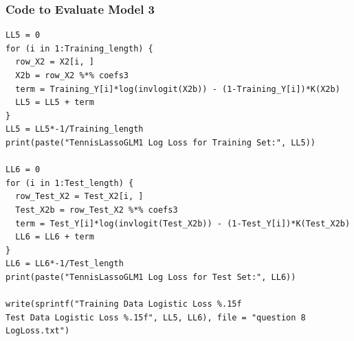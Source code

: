 \documentclass[11pt]{article} %
\begin{document}
\subsubsection*{Code to Evaluate Model 3}
\begin{lstlisting}
LL5 = 0
for (i in 1:Training_length) {
  row_X2 = X2[i, ]
  X2b = row_X2 %*% coefs3
  term = Training_Y[i]*log(invlogit(X2b)) - (1-Training_Y[i])*K(X2b)
  LL5 = LL5 + term
}
LL5 = LL5*-1/Training_length
print(paste("TennisLassoGLM1 Log Loss for Training Set:", LL5))

LL6 = 0
for (i in 1:Test_length) {
  row_Test_X2 = Test_X2[i, ]
  Test_X2b = row_Test_X2 %*% coefs3
  term = Test_Y[i]*log(invlogit(Test_X2b)) - (1-Test_Y[i])*K(Test_X2b)
  LL6 = LL6 + term
}
LL6 = LL6*-1/Test_length
print(paste("TennisLassoGLM1 Log Loss for Test Set:", LL6))

write(sprintf("Training Data Logistic Loss %.15f
Test Data Logistic Loss %.15f", LL5, LL6), file = "question 8 LogLoss.txt")
\end{lstlisting}
\end{document}
